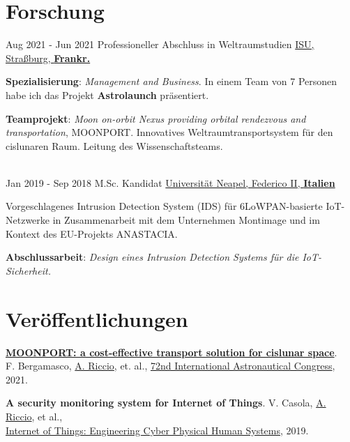 \documentclass[letterpaper]{twentysecondcv} %
\begin{document}
\section{Forschung}
\begin{twenty}
	\twentyitem
        {Aug 2021 -}
    	{Jun 2021}
        {Professioneller Abschluss in Weltraumstudien}
        {\href{https://www.isunet.edu/ssp/}{ISU, Straßburg, \textbf{Frankr.}}}
        {}
        {
            \vspace{1 mm}
            \textbf{Spezialisierung}: \textit{Management and Business}. In einem Team von 7 Personen habe ich das Projekt \textbf{Astrolaunch} präsentiert.

            \vspace{1 mm}
            \textbf{Teamprojekt}: \textit{Moon on-orbit Nexus providing orbital rendezvous and transportation}, MOONPORT. Innovatives Weltraumtransportsystem für den cislunaren Raum. Leitung des Wissenschaftsteams.
        }\\
	\twentyitem
        {Jan 2019 -}
    	{Sep 2018}
        {M.Sc. Kandidat}
        {\href{http://www.scuolapsb.unina.it/}{Universität Neapel, Federico II, \textbf{Italien}}}
        {}
        {
            Vorgeschlagenes Intrusion Detection System (IDS) für 6LoWPAN-basierte IoT-Netzwerke in Zusammenarbeit mit dem Unternehmen Montimage und im Kontext des EU-Projekts ANASTACIA.

           \vspace{1 mm}
           \textbf{Abschlussarbeit}: \textit{Design eines Intrusion Detection Systems für die IoT-Sicherheit.}
        }
\end{twenty}

\section{Veröffentlichungen}
    \href{https://www.researchgate.net/publication/355856343_MOONPORT_A_cost-effective_transport_solution_for_cislunar_space}
    {\textbf{MOONPORT: a cost-effective transport solution for cislunar space}}.\\
    F. Bergamasco, \href{https://scholar.google.com/citations?user=A3XqqTEAAAAJ&hl=it}{A. Riccio}, et. al.,
    \href{https://iafastro.directory/iac/paper/id/63931/summary/}
    {72nd International Astronautical Congress}, 2021.

    \textbf{A security monitoring system for Internet of Things}.
    V. Casola,  \href{https://scholar.google.com/citations?user=A3XqqTEAAAAJ&hl=it}{A. Riccio}, et al.,\\
    \href{https://www.researchgate.net/publication/334175322_A_security_monitoring_system_for_Internet_of_Things}
    {Internet of Things: Engineering Cyber Physical Human Systems}, 2019.
\end{document}
